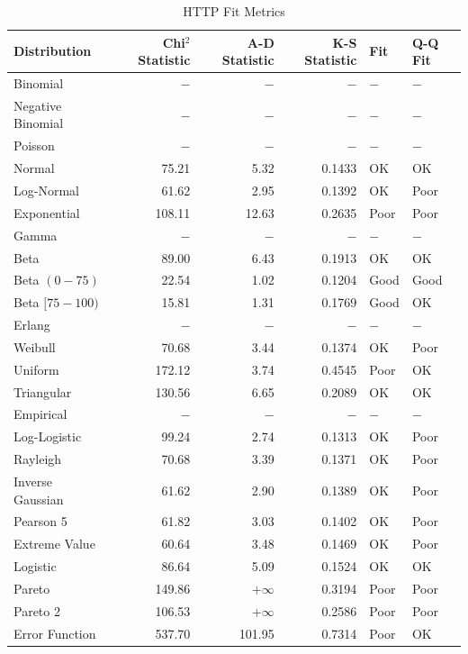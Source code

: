 \documentclass{article}
\begin{document}
\begin{table}[htbp]
\centering
\begin{tabular}{ l r r r l l }

\toprule
Distribution & Chi$^2$ Statistic & A-D Statistic & K-S Statistic & Fit & Q-Q Fit \\
\midrule

Binomial          &    $-$ &       $-$ &    $-$ & $-$  & $-$  \\
Negative Binomial &    $-$ &       $-$ &    $-$ & $-$  & $-$  \\
Poisson           &    $-$ &       $-$ &    $-$ & $-$  & $-$  \\
Normal            &  75.21 &      5.32 & 0.1433 & OK   & OK   \\
Log-Normal        &  61.62 &      2.95 & 0.1392 & OK   & Poor \\
Exponential       & 108.11 &     12.63 & 0.2635 & Poor & Poor \\
Gamma             &    $-$ &       $-$ &    $-$ & $-$  & $-$  \\
Beta              &  89.00 &      6.43 & 0.1913 & OK   & OK   \\
Beta $(0-75)$     &  22.54 &      1.02 & 0.1204 & Good & Good \\
Beta $[75-100)$   &  15.81 &      1.31 & 0.1769 & Good & OK   \\
Erlang            &    $-$ &       $-$ &    $-$ & $-$  & $-$  \\
Weibull           &  70.68 &      3.44 & 0.1374 & OK   & Poor \\
Uniform           & 172.12 &      3.74 & 0.4545 & Poor & OK   \\
Triangular        & 130.56 &      6.65 & 0.2089 & OK   & OK   \\
Empirical         &    $-$ &       $-$ &    $-$ & $-$  & $-$  \\
Log-Logistic      &  99.24 &      2.74 & 0.1313 & OK   & Poor \\
Rayleigh          &  70.68 &      3.39 & 0.1371 & OK   & Poor \\
Inverse Gaussian  &  61.62 &      2.90 & 0.1389 & OK   & Poor \\
Pearson 5         &  61.82 &      3.03 & 0.1402 & OK   & Poor \\
Extreme Value     &  60.64 &      3.48 & 0.1469 & OK   & Poor \\
Logistic          &  86.64 &      5.09 & 0.1524 & OK   & OK   \\
Pareto            & 149.86 & $+\infty$ & 0.3194 & Poor & Poor \\
Pareto 2          & 106.53 & $+\infty$ & 0.2586 & Poor & Poor \\
Error Function    & 537.70 &    101.95 & 0.7314 & Poor & OK   \\
\bottomrule

\end{tabular}
\caption{HTTP Fit Metrics}
\label{http_fit}
\end{table}
\end{document}
